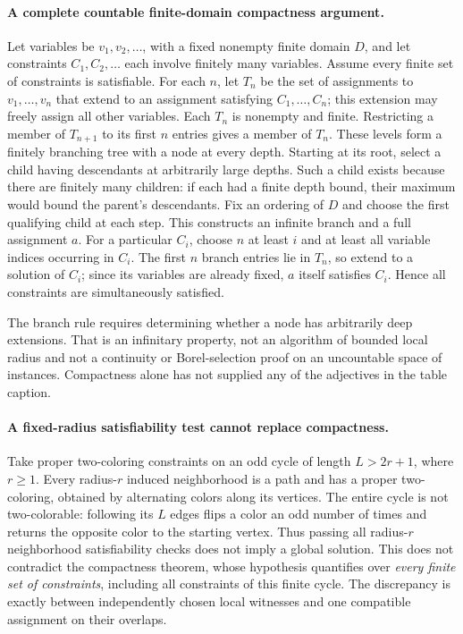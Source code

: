 \documentclass[11pt]{article}
\begin{document}
\paragraph{A complete countable finite-domain compactness argument.}
Let variables be $v_1,v_2,\ldots$, with a fixed nonempty finite domain $D$,
and let constraints $C_1,C_2,\ldots$ each involve finitely many variables.
Assume every finite set of constraints is satisfiable. For each $n$, let $T_n$
be the set of assignments to $v_1,\ldots,v_n$ that extend to an assignment
satisfying $C_1,\ldots,C_n$; this extension may freely assign all other
variables. Each $T_n$ is nonempty and finite. Restricting a member of
$T_{n+1}$ to its first $n$ entries gives a member of $T_n$.
These levels form a finitely branching tree with a node at every depth.
Starting at its root, select a child having descendants at arbitrarily large
depths. Such a child exists because there are finitely many children: if each
had a finite depth bound, their maximum would bound the parent's descendants.
Fix an ordering of $D$ and choose the first qualifying child at each step.
This constructs an infinite branch and a full assignment $a$.
For a particular $C_i$, choose $n$ at least $i$ and at least all variable
indices occurring in $C_i$. The first $n$ branch entries lie in $T_n$, so
extend to a solution of $C_i$; since its variables are already fixed, $a$
itself satisfies $C_i$. Hence all constraints are simultaneously satisfied.

The branch rule requires determining whether a node has arbitrarily deep
extensions. That is an infinitary property, not an algorithm of bounded local
radius and not a continuity or Borel-selection proof on an uncountable space
of instances. Compactness alone has not supplied any of the adjectives in the
table caption.

\paragraph{A fixed-radius satisfiability test cannot replace compactness.}
Take proper two-coloring constraints on an odd cycle of length $L>2r+1$,
where $r\geq1$. Every radius-$r$ induced neighborhood is a path and has a
proper two-coloring, obtained by alternating colors along its vertices.
The entire cycle is not two-colorable: following its $L$ edges flips a color
an odd number of times and returns the opposite color to the starting vertex.
Thus passing all radius-$r$ neighborhood satisfiability checks does not imply
a global solution. This does not contradict the compactness theorem, whose
hypothesis quantifies over \emph{every finite set of constraints}, including
all constraints of this finite cycle.
The discrepancy is exactly between independently chosen local witnesses and
one compatible assignment on their overlaps.
\end{document}
